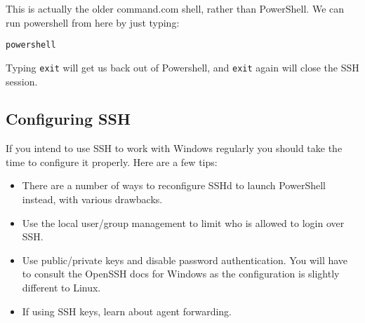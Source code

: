 This is actually the older command.com shell, rather than PowerShell. We
can run powershell from here by just typing:

\begin{verbatim}
powershell
\end{verbatim}

Typing \texttt{exit} will get us back out of Powershell, and
\texttt{exit} again will close the SSH session.

\subsection{Configuring SSH}\label{configuring-ssh}

If you intend to use SSH to work with Windows regularly you should take
the time to configure it properly. Here are a few tips:

\begin{itemize}
\item
  There are a number of ways to reconfigure SSHd to launch PowerShell
  instead, with various drawbacks.
\item
  Use the local user/group management to limit who is allowed to login
  over SSH.
\item
  Use public/private keys and disable password authentication. You will
  have to consult the OpenSSH docs for Windows as the configuration is
  slightly different to Linux.
\item
  If using SSH keys, learn about agent forwarding.
\end{itemize}

